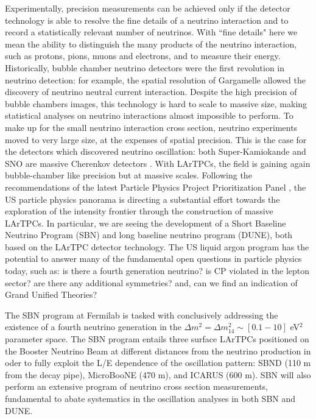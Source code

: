 Experimentally, precision measurements can be achieved only if the detector technology is able to resolve the fine details of a neutrino interaction and to record a statistically relevant number of neutrinos.  With ``fine details" here we mean the ability to distinguish the many products of the neutrino interaction, such as protons, pions, muons and electrons, and to measure their energy.
Historically,  bubble chamber neutrino detectors were the first revolution in neutrino detection: for example, the spatial resolution of Gargamelle allowed the discovery of neutrino neutral current interaction\cite{HASERT1973138}. Despite the high precision of bubble chambers images, this technology is hard to scale to massive size, making statistical analyses on neutrino interactions almost impossible to perform. To make up for the small neutrino interaction cross section, neutrino experiments moved to very large size, at the expenses of spatial precision. This is the case for the detectors which discovered neutrino oscillation:  both Super-Kamiokande and SNO are massive Cherenkov detectors \cite{PDGOsc}. With LArTPCs, the field is gaining again bubble-chamber like precision but at massive scales. Following the recommendations of  the latest Particle Physics Project Prioritization Panel  \cite{P5}, the US particle physics panorama is directing a substantial effort towards the exploration of the intensity frontier through the construction of massive LArTPCs. In particular, we are seeing the development of a Short Baseline Neutrino Program (SBN) and long baseline neutrino program  (DUNE), both based on the LArTPC detector technology. The US liquid argon program has the potential to answer many of the fundamental open questions in particle physics today, such as: is there a fourth generation neutrino? is CP violated in the lepton sector? are there any additional symmetries? and, can we find an indication of Grand Unified Theories? 

The SBN program at Fermilab is tasked with conclusively addressing the existence of a fourth neutrino generation in the  $\Delta m^2= \Delta m^2_{14} \sim [0.1 - 10]$ eV$^2$ parameter space. The SBN program entails three surface LArTPCs positioned on the Booster Neutrino Beam at different distances from the neutrino production in oder to fully exploit  the L/E dependence of the oscillation pattern:  SBND (110 m from the decay pipe), MicroBooNE (470 m), and ICARUS (600 m). SBN will also perform an extensive 
program of neutrino cross section measurements, fundamental to abate systematics in the oscillation analyses in both SBN and DUNE.

